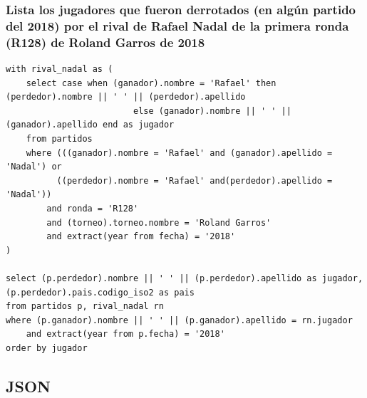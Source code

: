 \documentclass[11pt]{opticajnl}
\begin{document}
\subsubsection{Lista los jugadores que fueron derrotados (en algún partido del 2018) por el rival de Rafael Nadal de la primera ronda (R128) de Roland Garros de 2018}

\begin{verbatim}
with rival_nadal as (
	select case when (ganador).nombre = 'Rafael' then (perdedor).nombre || ' ' || (perdedor).apellido 
						 else (ganador).nombre || ' ' || (ganador).apellido end as jugador
	from partidos 
	where (((ganador).nombre = 'Rafael' and (ganador).apellido = 'Nadal') or 
		  ((perdedor).nombre = 'Rafael' and(perdedor).apellido = 'Nadal'))
		and ronda = 'R128'
		and (torneo).torneo.nombre = 'Roland Garros'
		and extract(year from fecha) = '2018'
)

select (p.perdedor).nombre || ' ' || (p.perdedor).apellido as jugador, (p.perdedor).pais.codigo_iso2 as pais
from partidos p, rival_nadal rn
where (p.ganador).nombre || ' ' || (p.ganador).apellido = rn.jugador
	and extract(year from p.fecha) = '2018'
order by jugador
\end{verbatim}


































\subsection{JSON}
\end{document}
